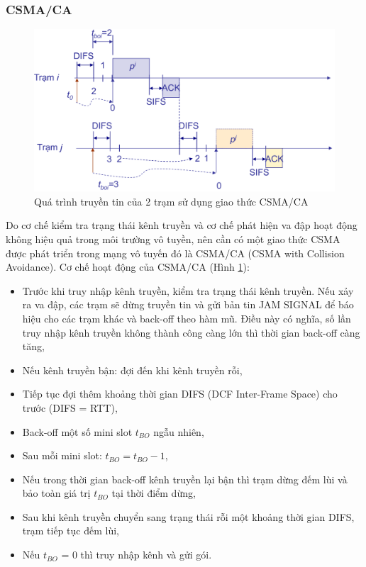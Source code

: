 \subsubsection{CSMA/CA}
\begin{figure}[h]
\begin{center}
\includegraphics[scale=0.26]{image/CSMACA}
\end{center}
\caption{Quá trình truyền tin của 2 trạm sử dụng giao thức CSMA/CA}
\label{CSMACA}
\end{figure}
\noindent Do cơ chế kiểm tra trạng thái kênh truyền và cơ chế phát hiện va đập hoạt động không hiệu quả trong môi trường vô tuyền, nên cần có một giao thức CSMA được phát triển trong mạng vô tuyến đó là CSMA/CA (CSMA with Collision Avoidance). Cơ chế hoạt động của CSMA/CA (Hình \ref{CSMACA}{}):
\begin{itemize}
\item Trước khi truy nhập kênh truyền, kiểm tra trạng thái kênh truyền. Nếu xảy ra va đập, các trạm sẽ dừng truyền tin và gửi bản tin JAM SIGNAL để báo hiệu cho các trạm khác và back-off theo hàm mũ. Điều này có nghĩa, số lần truy nhập kênh truyền không thành công càng lớn thì thời gian back-off càng tăng,
\item Nếu kênh truyền bận: đợi đến khi kênh truyền rỗi,
\item Tiếp tục đợi thêm khoảng thời gian DIFS (DCF Inter-Frame Space) cho trước (DIFS = RTT),
\item Back-off một số mini slot $t_{BO}$ ngẫu nhiên,
\item Sau mỗi mini slot: $t_{BO} = t_{BO} - 1${},
\item  Nếu trong thời gian back-off kênh truyền lại bận thì trạm dừng đếm lùi và bảo toàn giá trị $t_{BO}$ tại thời điểm dừng,
\item Sau khi kênh truyền chuyển sang trạng thái rỗi một khoảng thời gian DIFS, trạm tiếp tục đếm lùi,
\item Nếu $t_{BO}$ = 0 thì truy nhập kênh và gửi gói.
\end{itemize}
